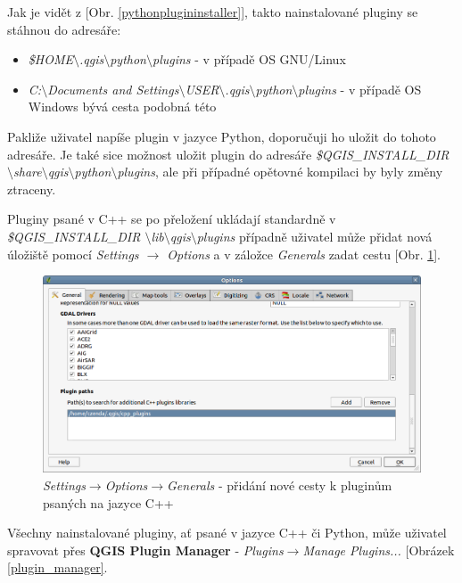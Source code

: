 \noindent Jak je vidět z [Obr. \ref{pythonplugininstaller}], takto nainstalované pluginy se stáhnou do adresáře: 

\begin{itemize}
	\item \textit{\$HOME$\setminus$.qgis$\setminus$python$\setminus$plugins} - v případě OS GNU/Linux
	\item \textit{C:$\setminus$Documents and Settings$\setminus$USER$\setminus$.qgis$\setminus$python$\setminus$plugins} - v případě OS Windows bývá cesta podobná této
\end{itemize}

Pakliže uživatel napíše plugin v jazyce Python, doporučuji ho uložit do tohoto adresáře. Je také sice možnost uložit plugin do adresáře \textit{\$QGIS\_INSTALL\_DIR $\setminus$share$\setminus$qgis$\setminus$python$\setminus$plugins}, ale při případné opětovné kompilaci by byly změny ztraceny.

\noindent Pluginy psané v C++ se po přeložení ukládají standardně v \textit{\$QGIS\_INSTALL\_DIR $\setminus$lib$\setminus$qgis$\setminus$plugins} případně uživatel může přidat nová úložiště pomocí \textit{Settings $\rightarrow$ Options} a v záložce \textit{Generals} zadat cestu [Obr. \ref{cpprepository}].

\begin{figure}
	\centering
	\includegraphics[scale=0.5]{pictures/qgis_plugin/options_cpp_path}
	\caption{\textit{Settings$\rightarrow$Options$\rightarrow$Generals} - přidání nové cesty k pluginům psaných na jazyce C++}
  	\label{cpprepository}
\end{figure}

Všechny nainstalované pluginy, ať psané v jazyce C++ či Python, může uživatel spravovat přes \textbf{QGIS Plugin Manager} - \textit{Plugins$\rightarrow$Manage Plugins...} [Obrázek \ref{plugin_manager}.

